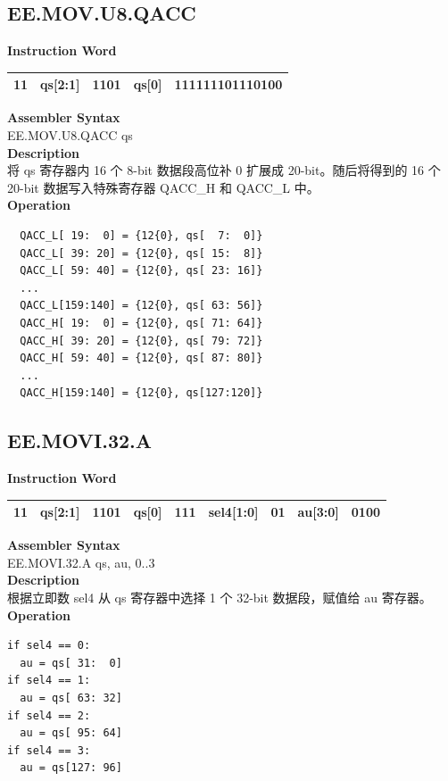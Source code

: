 \clearpage
\subsection{EE.MOV.U8.QACC}\label{instruction:EEMOVU8QACC}
\setlength\tabcolsep{6pt}
\textbf{Instruction Word} \\
\begin{tabular}{|c|c|c|c|c|}
	\hline
	11 & qs[2:1] & 1101 & qs[0] & 111111101110100 \\
	\hline
\end{tabular}

\textbf{Assembler Syntax} \\
EE.MOV.U8.QACC qs \\
\textbf{Description} \\
将 qs 寄存器内 16 个 8-bit 数据段高位补 0 扩展成 20-bit。随后将得到的 16 个 20-bit 数据写入特殊寄存器 QACC\_H 和 QACC\_L 中。\\
\textbf{Operation}
\begin{lstlisting}
  QACC_L[ 19:  0] = {12{0}, qs[  7:  0]}
  QACC_L[ 39: 20] = {12{0}, qs[ 15:  8]}
  QACC_L[ 59: 40] = {12{0}, qs[ 23: 16]}
  ...
  QACC_L[159:140] = {12{0}, qs[ 63: 56]}
  QACC_H[ 19:  0] = {12{0}, qs[ 71: 64]}
  QACC_H[ 39: 20] = {12{0}, qs[ 79: 72]}
  QACC_H[ 59: 40] = {12{0}, qs[ 87: 80]}
  ...
  QACC_H[159:140] = {12{0}, qs[127:120]}
\end{lstlisting}

\clearpage
\subsection{EE.MOVI.32.A}\label{instruction:EEMOVI32A}
\setlength\tabcolsep{6pt}
\textbf{Instruction Word} \\
\begin{tabular}{|c|c|c|c|c|c|c|c|c|}
	\hline
	11 & qs[2:1] & 1101 & qs[0] & 111 & sel4[1:0] & 01 & au[3:0] & 0100 \\
	\hline
\end{tabular}

\textbf{Assembler Syntax} \\
EE.MOVI.32.A qs, au, 0..3 \\
\textbf{Description} \\
根据立即数 sel4 从 qs 寄存器中选择 1 个 32-bit 数据段，赋值给 au 寄存器。\\
\textbf{Operation}
\begin{lstlisting}
if sel4 == 0:
  au = qs[ 31:  0]
if sel4 == 1:
  au = qs[ 63: 32]
if sel4 == 2:
  au = qs[ 95: 64]
if sel4 == 3:
  au = qs[127: 96]
\end{lstlisting}

